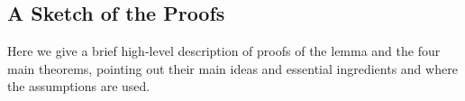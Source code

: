 


\subsection{A Sketch of the Proofs} \label{sec:sketch}

Here we give a brief high-level description of proofs of the lemma and the four main theorems, pointing out their main ideas and essential ingredients and where the assumptions are used.

